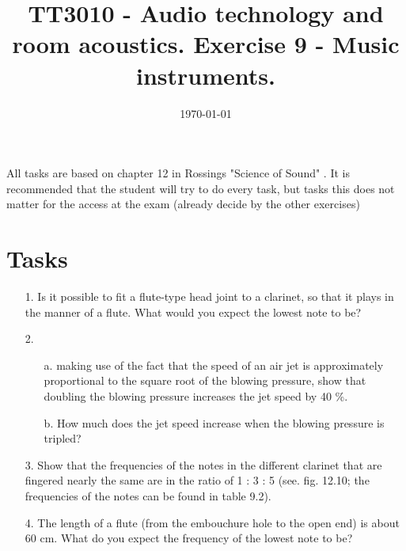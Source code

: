 \documentclass{article}
\title{TT3010 - Audio technology and room acoustics. \newline Exercise 9 - Music instruments.}
\date{\today}
\begin{document}
\maketitle

All tasks are based on chapter 12 in Rossings "Science of Sound" \cite{rossing}. 
It is recommended that the student will try to do every task, but tasks this does not matter for the access at the exam (already decide by the other exercises)

\section*{Tasks}
\begin{itemize}
   
   
    \item[1.] Is it possible to fit a flute-type head joint to a clarinet, so that it plays in the manner of a flute. What would you expect the lowest note to be?
    
    \item[2.] 
        \begin{itemize}
            \item[a.] making use of the fact that the speed of an air jet is approximately proportional  to the square root of the blowing pressure, show that doubling the blowing pressure increases the jet speed by 40 \%.
            \item[b.] How much does the jet speed increase when the blowing pressure is tripled?
        \end{itemize}

    \item[3.] Show that the frequencies of the notes in the different  clarinet that are fingered nearly the same are in the ratio of 1 : 3 : 5 (see. fig. 12.10; the frequencies of the notes can be found in table 9.2).
    

    \item[4.] The length of a flute (from the embouchure hole to  the open end) is about 60 cm. What do you expect the frequency of the lowest note  to be?
    

\end{itemize}

\end{document}
